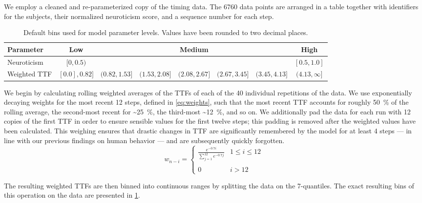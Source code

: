 We employ a cleaned and re-parameterized copy of the timing data.
The \num{6760} data points are arranged in a table together with identifiers for the subjects, their normalized neuroticism score, and a sequence number for each step.

\begin{table}[]
    \centering
    \caption{%
        Default bins used for model parameter levels.
        Values have been rounded to two decimal places.
    }
    \label{tab:defaultbins}
    \begin{tabular}{@{}lccccccc@{}}
        \toprule
        \textbf{Parameter} & \textbf{Low} & & & \textbf{Medium} & & & \textbf{High}         \\ \midrule
        Neuroticism        & \( [0, 0.5) \) & & & & & & \( [0.5, 1.0] \)      \\
        Weighted TTF & \([0.0], 0.82]\) & \((0.82, 1.53]\) & \((1.53, 2.08]\) & \((2.08, 2.67]\) & \((2.67, 3.45]\) & \((3.45, 4.13]\) & \((4.13, \infty]\)
    \end{tabular}
\end{table}

We begin by calculating rolling weighted averages of the \acp{TTF} of each of the \num{40} individual repetitions of the data.
We use exponentially decaying weights for the most recent \num{12} steps, defined in \cref{eq:weights}, such that the most recent \ac{TTF} accounts for roughly \SI{50}{\percent} of the rolling average, the second-most recent for \textasciitilde\SI{25}{\percent}, the third-most \textasciitilde\SI{12}{\percent}, and so on.
We additionally pad the data for each run with \num{12} copies of the first \ac{TTF} in order to ensure sensible values for the first twelve steps; this padding is removed after the weighted values have been calculated.
This weighing ensures that drastic changes in \ac{TTF} are significantly remembered by the model for at least \num{4} steps --- in line with our previous findings on human behavior --- and are subsequently quickly forgotten.
\begin{equation}\label{eq:weights}
    w_{n - i} = 
    \left\{ \begin{array}{ll}
        \frac{e^{-0.7 i}}{\sum\limits^{12}_{j=1} e^{-0.7 j}} & 1 \leq i \leq 12 \\
        & \\
        0 & i > 12
    \end{array} \right.
\end{equation}

The resulting weighted \acp{TTF} are then binned into continuous ranges by splitting the data on the \num{7}-quantiles.
The exact resulting bins of this operation on the data are presented in \cref{tab:defaultbins}.

